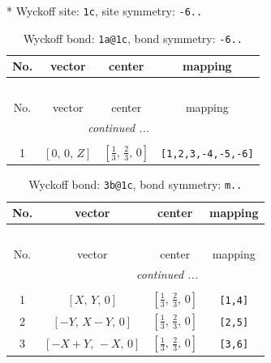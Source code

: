 \documentclass[fleqn,8pt]{jsarticle}
\begin{document}
* Wyckoff site: {\tt 1c}, site symmetry: {\tt -6..}
\renewcommand{\arraystretch}{1.2}
\begin{longtable}{cccc}
\caption{Wyckoff bond: {\tt 1a@1c}, bond symmetry: {\tt -6..}}
 \\
 \hline \hline
No. & vector & center & mapping \\ \hline \endfirsthead

\multicolumn{3}{l}{\tablename\ \thetable{}} \\
 \hline \hline
No. & vector & center & mapping \\ \hline \endhead

 \hline \hline
\multicolumn{3}{r}{\footnotesize\it continued ...} \\ \endfoot

 \hline \hline
\multicolumn{3}{r}{} \\ \endlastfoot

1 & $\left[ 0,\, 0,\, Z \right]$ & $\left[ \frac{1}{3},\, \frac{2}{3},\, 0 \right]$ & {\tt [1,2,3,-4,-5,-6]} \\
\end{longtable}
\renewcommand{\arraystretch}{1.2}
\begin{longtable}{cccc}
\caption{Wyckoff bond: {\tt 3b@1c}, bond symmetry: {\tt m..}}
 \\
 \hline \hline
No. & vector & center & mapping \\ \hline \endfirsthead

\multicolumn{3}{l}{\tablename\ \thetable{}} \\
 \hline \hline
No. & vector & center & mapping \\ \hline \endhead

 \hline \hline
\multicolumn{3}{r}{\footnotesize\it continued ...} \\ \endfoot

 \hline \hline
\multicolumn{3}{r}{} \\ \endlastfoot

1 & $\left[ X,\, Y,\, 0 \right]$ & $\left[ \frac{1}{3},\, \frac{2}{3},\, 0 \right]$ & {\tt [1,4]} \\ \hline
2 & $\left[ - Y,\, X - Y,\, 0 \right]$ & $\left[ \frac{1}{3},\, \frac{2}{3},\, 0 \right]$ & {\tt [2,5]} \\ \hline
3 & $\left[ - X + Y,\, - X,\, 0 \right]$ & $\left[ \frac{1}{3},\, \frac{2}{3},\, 0 \right]$ & {\tt [3,6]} \\
\end{longtable}
\renewcommand{\arraystretch}{1.2}
\end{document}
